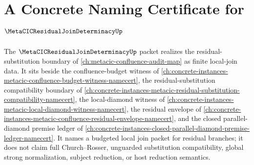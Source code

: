 \chapter{A Concrete Naming Certificate for $\MetaCICResidualJoinDeterminacyUp$}
\label{ch:concrete-instances-metacic-residual-join-determinacy-namecert}

The $\MetaCICResidualJoinDeterminacyUp$ packet realizes the residual-substitution boundary of \autoref{ch:metacic-confluence-audit-map} as finite local-join data. It sits beside the confluence-budget witness of \autoref{ch:concrete-instances-metacic-confluence-budget-witness-namecert}, the residual-substitution compatibility boundary of \autoref{ch:concrete-instances-metacic-residual-substitution-compatibility-namecert}, the local-diamond witness of \autoref{ch:concrete-instances-metacic-local-diamond-witness-namecert}, the residual envelope of \autoref{ch:concrete-instances-metacic-confluence-residual-envelope-namecert}, and the closed parallel-diamond premise ledger of \autoref{ch:concrete-instances-closed-parallel-diamond-premise-ledger-namecert}. It names a budgeted local join packet for residual branches; it does not claim full Church--Rosser, unguarded substitution compatibility, global strong normalization, subject reduction, or host reduction semantics.


